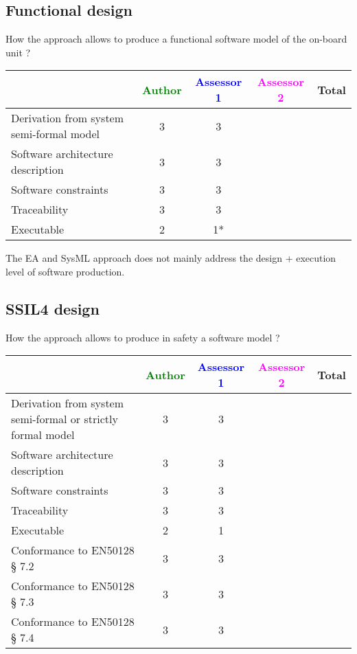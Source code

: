 \subsection{Functional design}

How the approach allows to  produce a functional software model of the on-board unit ?

\begin{tabular}{|l | c | c | c | c|}
\hline
& \textcolor{green}{Author} & \textcolor{blue}{Assessor 1} & \textcolor{magenta}{Assessor 2} & Total \\
\hline
Derivation from system semi-formal model  &3 & 3& &  \\
\hline 
Software architecture description  &3 & 3& &  \\
\hline
Software constraints  &3 & 3& &  \\
\hline
Traceability  &3 & 3& &  \\
\hline
Executable  &2 & 1*& &  \\
\hline
\end{tabular}

\begin{assessor1}
The EA and SysML approach does not mainly address the design + execution level of software production. 
\end{assessor1}

\subsection{SSIL4 design}

How the approach allows to  produce in safety a software model ?

\begin{tabular}{|l | c | c | c | c|}
\hline
& \textcolor{green}{Author} & \textcolor{blue}{Assessor 1} & \textcolor{magenta}{Assessor 2} & Total \\
\hline
Derivation from system semi-formal or strictly formal model  &3 & 3& &  \\
\hline 
Software architecture description  &3 & 3& &  \\
\hline
Software constraints  &3 & 3& &  \\
\hline
Traceability  &3 & 3& &  \\
\hline
Executable  &2 & 1& &  \\
\hline
Conformance to EN50128 § 7.2  &3 & 3& &  \\
\hline
Conformance to EN50128 § 7.3  &3 & 3& &  \\
\hline
Conformance to EN50128 § 7.4  & 3& 3& &  \\
\hline
\end{tabular}

